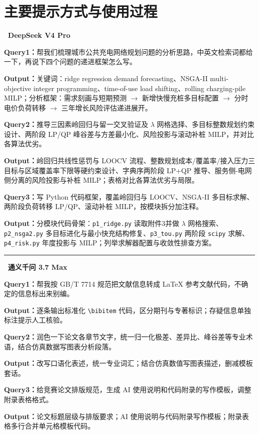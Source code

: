 \documentclass[12pt,a4paper]{ctexart}
\begin{document}
\section{主要提示方式与使用过程}

\noindent\textbf{\textbullet~DeepSeek V4 Pro}

\textbf{Query1：}帮我们梳理城市公共充电网络规划问题的分析思路，中英文检索词都给一下，再说下四个问题的递进框架怎么写。

\textbf{Output：}关键词：ridge regression demand forecasting、NSGA-II multi-objective integer programming、time-of-use load shifting、rolling charging-pile MILP；分析框架：需求刻画与短期预测 $\to$ 新增快慢充桩多目标配置 $\to$ 分时电价负荷转移 $\to$ 三年增长风险评估递进展开。

\textbf{Query2：}推导三因素岭回归与留一交叉验证及 $\lambda$ 网格选择、多目标整数规划约束设计、两阶段 LP/QP 峰谷差与方差最小化、风险投影与滚动补桩 MILP，并对比各算法优劣。

\textbf{Output：}岭回归共线性惩罚与 LOOCV 流程、整数规划成本/覆盖率/接入压力三目标与区域覆盖率下限等硬约束设计、字典序两阶段 LP+QP 推导、服务侧-电网侧分离的风险投影与补桩 MILP；表格对比各算法优劣与局限。

\textbf{Query3：}写 Python 代码框架，覆盖岭回归与 LOOCV、NSGA-II 多目标求解、两阶段负荷转移 LP/QP、滚动补桩 MILP，按模块拆分加注释。

\textbf{Output：}分模块代码骨架：\texttt{p1\_ridge.py} 读取附件3并做 $\lambda$ 网格搜索、\texttt{p2\_nsga2.py} 多目标进化与最小快充结构修复、\texttt{p3\_tou.py} 两阶段 \verb|scipy| 求解、\texttt{p4\_risk.py} 年度投影与 MILP；列举求解器配置与收敛性排查方案。

\noindent\rule{\linewidth}{0.4pt}

\noindent\textbf{\textbullet~通义千问 3.7 Max}

\textbf{Query1：}帮我按 GB/T 7714 规范把文献信息转成 LaTeX 参考文献代码，不确定的信息标出来别编。

\textbf{Output：}逐条输出标准化 \verb|\bibitem| 代码，区分期刊与专著标识；存疑信息单独标注提示人工核验。

\textbf{Query2：}润色一下论文各章节文字，统一归一化极差、差异比、峰谷差等专业术语，结合仿真数据写图表分析段落。

\textbf{Output：}改写口语化表述，统一专业词汇；结合仿真数值写图表描述，删减模板套话。

\textbf{Query3：}给竞赛论文排版规范，生成 AI 使用说明和代码附录的写作模板，调整附录表格格式。

\textbf{Output：}论文标题层级与排版要求；AI 使用说明与代码附录写作模板；附录表格多行合并单元格模板代码。
\end{document}
